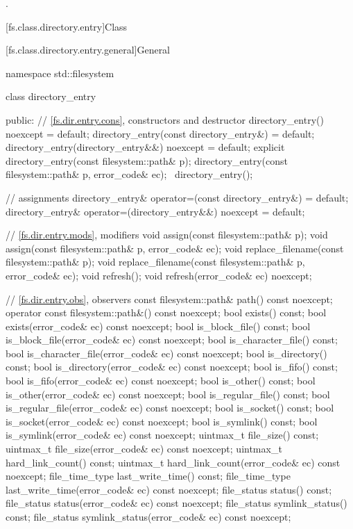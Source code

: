 \begin{itemdescr}
\pnum
\ensures
{}.
\end{itemdescr}

[fs.class.directory.entry]{Class }

[fs.class.directory.entry.general]{General}

%
\begin{codeblock}
namespace std::filesystem {
  class directory_entry {
  public:
    // \ref{fs.dir.entry.cons}, constructors and destructor
    directory_entry() noexcept = default;
    directory_entry(const directory_entry&) = default;
    directory_entry(directory_entry&&) noexcept = default;
    explicit directory_entry(const filesystem::path& p);
    directory_entry(const filesystem::path& p, error_code& ec);
    ~directory_entry();

    // assignments
    directory_entry& operator=(const directory_entry&) = default;
    directory_entry& operator=(directory_entry&&) noexcept = default;

    // \ref{fs.dir.entry.mods}, modifiers
    void assign(const filesystem::path& p);
    void assign(const filesystem::path& p, error_code& ec);
    void replace_filename(const filesystem::path& p);
    void replace_filename(const filesystem::path& p, error_code& ec);
    void refresh();
    void refresh(error_code& ec) noexcept;

    // \ref{fs.dir.entry.obs}, observers
    const filesystem::path& path() const noexcept;
    operator const filesystem::path&() const noexcept;
    bool exists() const;
    bool exists(error_code& ec) const noexcept;
    bool is_block_file() const;
    bool is_block_file(error_code& ec) const noexcept;
    bool is_character_file() const;
    bool is_character_file(error_code& ec) const noexcept;
    bool is_directory() const;
    bool is_directory(error_code& ec) const noexcept;
    bool is_fifo() const;
    bool is_fifo(error_code& ec) const noexcept;
    bool is_other() const;
    bool is_other(error_code& ec) const noexcept;
    bool is_regular_file() const;
    bool is_regular_file(error_code& ec) const noexcept;
    bool is_socket() const;
    bool is_socket(error_code& ec) const noexcept;
    bool is_symlink() const;
    bool is_symlink(error_code& ec) const noexcept;
    uintmax_t file_size() const;
    uintmax_t file_size(error_code& ec) const noexcept;
    uintmax_t hard_link_count() const;
    uintmax_t hard_link_count(error_code& ec) const noexcept;
    file_time_type last_write_time() const;
    file_time_type last_write_time(error_code& ec) const noexcept;
    file_status status() const;
    file_status status(error_code& ec) const noexcept;
    file_status symlink_status() const;
    file_status symlink_status(error_code& ec) const noexcept;

}}
\end{codeblock}

